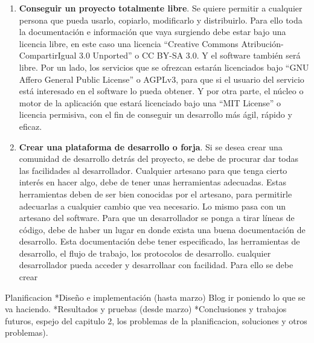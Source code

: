 \begin{enumerate}{Subobjetivos:}
\item \textbf{Conseguir un proyecto totalmente libre}. Se quiere permitir a cualquier persona que pueda usarlo, copiarlo, modificarlo y distribuirlo. Para ello toda la documentación e información que vaya surgiendo debe estar bajo una licencia libre, en este caso una licencia ``Creative Commons Atribución-CompartirIgual 3.0 Unported'' o CC BY-SA 3.0. Y el software también será libre. Por un lado, los servicios que se ofrezcan estarán licenciados bajo ``GNU Affero General Public License'' o AGPLv3, para que si el usuario del servicio está interesado en el software lo pueda obtener. Y por otra parte, el núcleo o motor de la aplicación que estará licenciado bajo una ``MIT License'' o licencia permisiva, con el fin de conseguir un desarrollo más ágil, rápido y eficaz. 

\item \textbf{Crear una plataforma de desarrollo o forja}. Si se desea crear una comunidad de desarrollo detrás del proyecto, se debe de procurar dar todas las facilidades al desarrollador. Cualquier artesano para que tenga cierto interés en hacer algo, debe de tener unas herramientas adecuadas. Estas herramientas deben de ser bien conocidas por el artesano, para permitirle adecuarlas a cualquier cambio que vea necesario. Lo mismo pasa con un artesano del software. Para que un desarrollador se ponga a tirar líneas de código, debe de haber un lugar en donde exista una buena documentación de desarrollo. Esta documentación debe tener especificado, las herramientas de desarrollo, el flujo de trabajo, los protocolos de desarrollo. cualquier desarrollador pueda acceder y desarrollaar con facilidad. Para ello se debe crear
\end{enumerate}

Planificacion
*Diseño e implementación (hasta marzo) Blog ir poniendo lo que se va haciendo.
*Resultados y pruebas (desde marzo)
*Conclusiones y trabajos futuros, espejo del capitulo 2, los problemas de la planificacion, soluciones y otros problemas).
